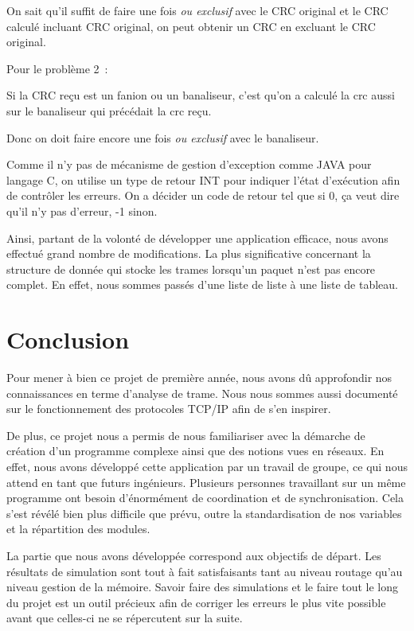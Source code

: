 \documentclass[a4paper,11pt]{article}
\begin{document}
On sait qu'il suffit de faire une fois \textit{ou exclusif} avec le CRC original et le CRC calculé incluant CRC original, on peut obtenir un CRC  en excluant le CRC original.

Pour le problème 2 :

Si la CRC reçu est un fanion ou un banaliseur, c'est qu'on a
 calculé la crc aussi sur le banaliseur qui précédait la crc reçu.

Donc on doit faire encore une fois \textit{ou exclusif} avec le banaliseur.


Comme il n'y pas de mécanisme de gestion d'exception comme JAVA pour langage C, on utilise un type de retour INT pour indiquer l'état d'exécution afin de contrôler les erreurs.
On a décider un code de retour tel que si 0, ça veut dire qu'il n'y pas d'erreur, -1 sinon.

\vspace{0.5cm}

Ainsi, partant de la volonté de développer une application efficace, nous avons effectué grand nombre de modifications. La plus significative concernant la structure de donnée qui stocke les trames lorsqu'un paquet n'est pas encore complet. En effet, nous sommes passés d'une liste de liste à une liste de tableau.

\section{Conclusion}

Pour mener à bien ce projet de première année, nous avons dû approfondir nos connaissances en terme d'analyse de trame. Nous nous sommes aussi documenté sur le fonctionnement des protocoles TCP/IP afin de s'en inspirer.

De plus, ce projet nous a permis de nous familiariser avec la démarche de création d'un programme complexe ainsi  que des notions vues en réseaux. En effet, nous avons développé cette application par un travail de groupe, ce qui nous attend en tant que futurs ingénieurs. Plusieurs personnes travaillant sur un même programme ont besoin d'énormément de coordination et de synchronisation. Cela s'est révélé bien plus difficile que prévu, outre la standardisation de nos variables et la répartition des modules.

La partie que nous avons développée correspond aux objectifs de départ. Les résultats de simulation sont tout à fait satisfaisants tant au niveau routage qu'au niveau gestion de la mémoire. Savoir faire des simulations et le faire tout le long du projet est un outil précieux afin de corriger les erreurs le plus vite possible avant que celles-ci ne se répercutent sur la suite.
\end{document}
